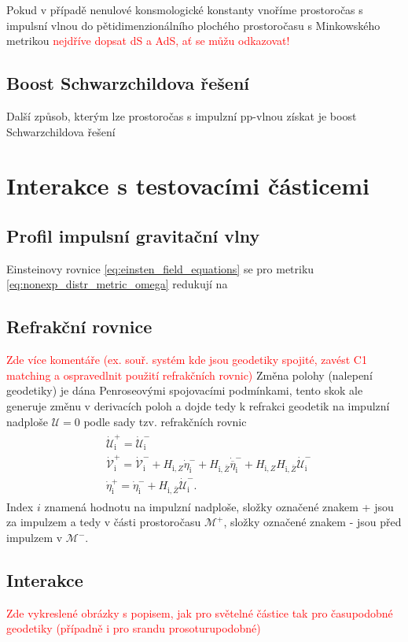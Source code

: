 Pokud v případě nenulové konsmologické konstanty vnoříme prostoročas s impulsní vlnou do pětidimenzionálního plochého
prostoročasu s Minkowského metrikou \textcolor{red}{nejdříve dopsat dS a AdS, ať se můžu odkazovat!}

\subsection{Boost Schwarzchildova řešení}
Další způsob, kterým lze prostoročas s impulzní pp-vlnou získat je boost Schwarzchildova řešení

\section{Interakce s testovacími částicemi}

\subsection{Profil impulsní gravitační vlny}

Einsteinovy rovnice \eqref{eq:einsten_field_equations} se pro metriku \eqref{eq:nonexp_distr_metric_omega}
redukují na

\subsection{Refrakční rovnice}
\textcolor{red}{Zde více komentáře (ex. souř. systém kde jsou geodetiky spojité,
zavést C1 matching a ospravedlnit použití refrakčních rovnic)}
Změna polohy (nalepení geodetiky) je dána Penroseovými spojovacími podmínkami, tento skok ale generuje změnu v derivacích poloh a dojde tedy
k refrakci geodetik na impulzní nadploše $\mathcal{U}=0$ podle sady tzv. refrakčních rovnic
\begin{align}
    \label{eq:refraction_nonexpanding}
    \begin{split}
        &\dot{\mathcal{U}}^{+}_{\mathrm{i}} = \dot{\mathcal{U}}^{-}_{\mathrm{i}}\\
        &\dot{\mathcal{V}}^{+}_{\mathrm{i}} = \dot{\mathcal{V}}_{\mathrm{i}}^{-} + H_{\mathrm{i}, Z}
        \dot{\eta}^{-}_{\mathrm{i}} + H_{\mathrm{i}, \bar{Z}} \dot{\overline{\eta}}^{-}_{\mathrm{i}} + 
        H_{\mathrm{i}, Z} H_{\mathrm{i}, \bar{Z}} \dot{\mathcal{U}}_{\mathrm{i}}^{-}\\
        &\dot{\eta}_{\mathrm{i}}^{+} =\dot{\eta}_{\mathrm{i}}^{-}+H_{\mathrm{i}, \bar{Z}}
        \dot{\mathcal{U}}_{\mathrm{i}}^{-}.
    \end{split}
\end{align}
Index $i$ znamená hodnotu na impulzní nadploše, složky označené znakem + jsou za impulzem a tedy v části prostoročasu $\mathcal{M}^+$,
složky označené znakem - jsou před impulzem v $\mathcal{M}^-$.


\subsection{Interakce}
\textcolor{red}{Zde vykreslené obrázky s popisem, jak pro světelné částice tak pro
časupodobné geodetiky (případně i pro srandu prosoturupodobné)}
